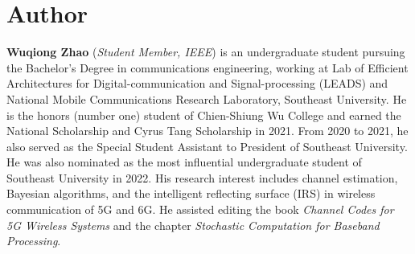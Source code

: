 \section{Author}
\textbf{Wuqiong Zhao} (\textit{Student Member, IEEE})
is an undergraduate student pursuing the Bachelor's Degree in communications engineering, working at Lab of Efficient Architectures for Digital-communication and Signal-processing (LEADS) and National Mobile Communications Research Laboratory, Southeast University.
He is the honors (number one) student of Chien-Shiung Wu College
and earned the National Scholarship and Cyrus Tang Scholarship in 2021.
From 2020 to 2021, he also served as the Special Student Assistant to President of Southeast University.
He was also nominated as the most influential undergraduate student of Southeast University in 2022.
His research interest includes channel estimation, Bayesian algorithms, and the intelligent reflecting surface (IRS) in wireless communication of 5G and 6G.
He assisted editing the book \textit{Channel Codes for 5G Wireless Systems} and the chapter \textit{Stochastic Computation for Baseband Processing}.
